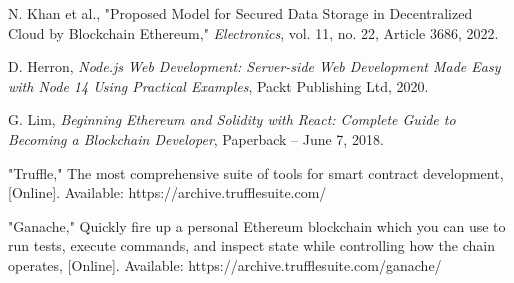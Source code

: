 \documentclass[10pt,conference,a4paper]{IEEEtran_EDM}
\begin{document}
\begin{thebibliography}{00}
 N. Khan et al., "Proposed Model for Secured Data Storage in Decentralized Cloud by Blockchain Ethereum," \textit{Electronics}, vol. 11, no. 22, Article 3686, 2022.

 D. Herron, \textit{Node.js Web Development: Server-side Web Development Made Easy with Node 14 Using Practical Examples}, Packt Publishing Ltd, 2020.

 G. Lim, \textit{Beginning Ethereum and Solidity with React: Complete Guide to Becoming a Blockchain Developer}, Paperback – June 7, 2018.

 "Truffle," The most comprehensive suite of tools for smart contract development, [Online]. Available: https://archive.trufflesuite.com/

 "Ganache," Quickly fire up a personal Ethereum blockchain which you can use to run tests, execute commands, and inspect state while controlling how the chain operates, [Online]. Available: https://archive.trufflesuite.com/ganache/

\end{thebibliography}
\end{document}
